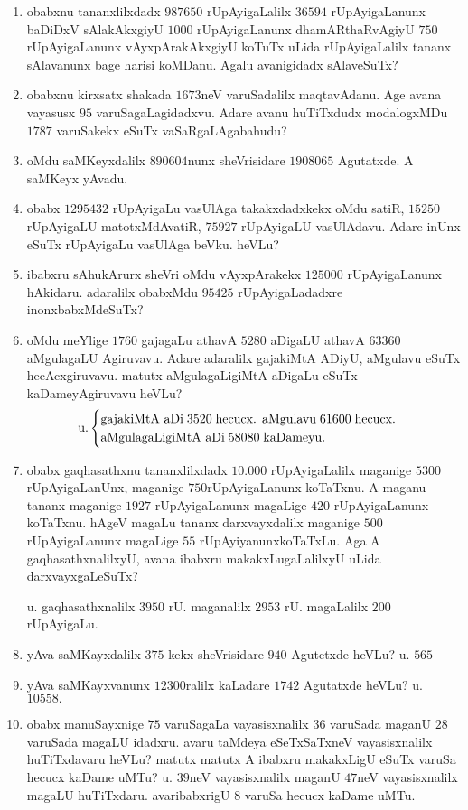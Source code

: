 \begin{enumerate}[\rm(1)]
\item obabxnu tananxlilxdadx $987650$ rUpAyigaLalilx $36594$ rUpAyigaLanunx baDiDxV sAlakAkxgiyU $1000$ rUpAyigaLanunx dhamARthaRvAgiyU $750$ rUpAyigaLanunx vAyxpArakAkxgiyU koTuTx uLida rUpAyigaLalilx tananx sAlavanunx bage harisi koMDanu. Agalu avanigidadx sAlaveSuTx?
\item obabxnu kirxsatx shakada $1673$neV varuSadalilx maqtavAdanu. Age avana vayasusx $95$ varuSagaLagidadxvu. Adare avanu huTiTxdudx modalogxMDu $1787$ varuSakekx eSuTx vaSaRgaLAgabahudu?
\item oMdu saMKeyxdalilx $890604$nunx sheVrisidare $1908065$ Agutatxde. A saMKeyx yAvadu.
\item obabx $1295432$ rUpAyigaLu vasUlAga takakxdadxkekx oMdu satiR, $15250$ rUpAyigaLU matotxMdAvatiR, $75927$ rUpAyigaLU vasUlAdavu. Adare inUnx eSuTx rUpAyigaLu vasUlAga beVku. heVLu?
\item ibabxru sAhukArurx sheVri oMdu vAyxpArakekx $125000$ rUpAyigaLanunx hAkidaru. adaralilx obabxMdu $95425$ rUpAyigaLadadxre inonxbabxMdeSuTx?
\item oMdu meYlige $1760$ gajagaLu athavA $5280$ aDigaLU athavA $63360$ aMgulagaLU Agiruvavu. Adare adaralilx gajakiMtA ADiyU, aMgulavu eSuTx hecAcxgiruvavu. matutx aMgulagaLigiMtA aDigaLu eSuTx kaDameyAgiruvavu heVLu?
\begin{equation*}
\text{u.}
\begin{cases}
\text{gajakiMtA aDi\;} {\rm 3520\;} \text{hecucx. aMgulavu\;} {\rm 61600\;} \text{hecucx.}\\  
\text{aMgulagaLigiMtA aDi\;} {\rm 58080\;} \text{kaDameyu.}
\end{cases}
\end{equation*}

\item obabx gaqhasathxnu tananxlilxdadx $10.000$ rUpAyigaLalilx maganige $5300$ rUpAyigaLanUnx, maganige $750$\break rUpAyigaLanunx koTaTxnu. A maganu tananx maganige $1927$ rUpAyigaLanunx magaLige $420$ rUpAyigaLanunx koTaTxnu. hAgeV magaLu tananx darxvayxdalilx maganige $500$ rUpAyigaLanunx magaLige $55$ rUpAyiyanunx\break koTaTxLu. Aga A gaqhasathxnalilxyU, avana ibabxru makakxLugaLalilxyU uLida darxvayxgaLeSuTx?

u. gaqhasathxnalilx $3950$ rU. maganalilx $2953$ rU. magaLalilx $200$ rUpAyigaLu.

\item yAva saMKayxdalilx $375$ kekx sheVrisidare $940$ Agutetxde heVLu? \quad u. $565$

\item yAva saMKayxvanunx $12300$ralilx kaLadare $1742$ Agutatxde heVLu? \quad u. $10558.$

\item obabx manuSayxnige $75$ varuSagaLa vayasisxnalilx $36$ varuSada maganU $28$ varuSada magaLU idadxru. avaru taMdeya eSeTxSaTxneV vayasisxnalilx huTiTxdavaru heVLu? matutx matutx A ibabxru makakxLigU e\-SuTx varuSa hecucx kaDame uMTu? \quad u. $39$neV vayasisxnalilx maganU $47$neV vayasisxnalilx magaLU huTiTxdaru. avaribabxrigU $8$ varuSa hecucx kaDame uMTu.

\end{enumerate}


